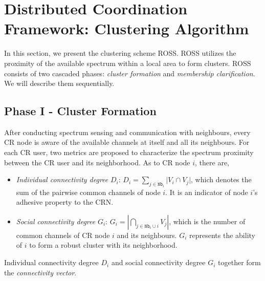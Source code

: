 \documentclass[10pt,journal,compsoc]{IEEEtran}
\theoremstyle{mytheoremstyle}
\theoremstyle{mytheoremstyle}
\theoremstyle{mytheoremstyle}
\begin{document}
\section{Distributed Coordination Framework: Clustering Algorithm}
\label{ross}

In this section, we present the clustering scheme ROSS.
ROSS utilizes the proximity of the available spectrum within a local area to form clusters.
ROSS consists of two cascaded phases: \textit{cluster formation} and \textit{membership clarification}.
We will describe them sequentially.

\subsection{Phase I - Cluster Formation}
\label{phaseI}
After conducting spectrum sensing and communication with neighbours, every CR node is aware of the available channels at itself and all its neighbours.
For each CR user, two metrics are proposed to characterize the spectrum proximity between the CR user and its neighborhood.
As to CR node $i$, there are,
\begin{itemize}

\item \textit{Individual connectivity degree} $D_i$: $D_i=\sum_{j\in \texttt{Nb}_i}\vert V_i\cap V_j\vert$, which denotes the sum of the pairwise common channels of node $i$. 
It is an indicator of node $i$'s adhesive property to the CRN. 

\item \textit{Social connectivity degree} $G_i$: $G_i=|\bigcap_{j\in \texttt{Nb}_i\cup i}V_j|$, which is the number of common channels of CR node $i$ and its neighbours.
$G_i$ represents the ability of $i$ to form a robust cluster with its neighborhood.
\end{itemize}
Individual connectivity degree $D_i$ and social connectivity degree $G_i$ together form the \textit{connectivity vector}.
\end{document}
